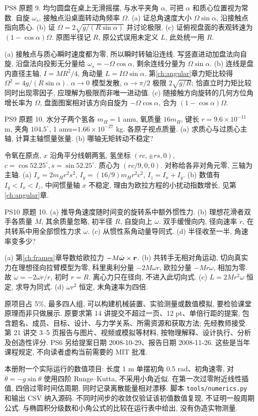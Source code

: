 \begin{exercise}
PS8 原题 9. 均匀圆盘在桌上无滑摇摆, 与水平夹角 $\alpha$, 可把 $\alpha$ 和质心位置视为常数. 自旋 $\omega_s$, 接触点沿桌面转动角频率 $\Omega$. (a) 证总角速度大小 $\Omega\sin\alpha$, 沿接触点指向质心. (b) 证 $\Omega=2\sqrt{g/(R\sin\alpha)}$ 并讨论极限. (c) 证俯视盘面的表观转速为 $(1-\cos\alpha)\Omega$. 原图半径记 $R$, 原公式误用未定义 $L$, 此处统一用 $R$.
\end{exercise}
\begin{solution}
(a) 接触点与质心瞬时速度都为零, 所以瞬时转轴沿连线. 写竖直进动加盘法向自旋, 沿盘法向投影无分量给 $\omega_s=-\Omega\cos\alpha$, 剩余连线分量为 $\Omega\sin\alpha$. (b) 连线是盘内直径主轴, $I=MR^2/4$, 角动量 $L=I\Omega\sin\alpha$. 第\ref{ch:angular}章力矩比较得 $\Omega^2=4g/(R\sin\alpha)$. $\alpha\to0$ 模型发散, $\alpha\to\pi/2$ 极限 $2\sqrt{g/R}$; 恰直立时力矩比较同时出现零因子, 应理解为极限而非唯一进动值. (c) 随接触方向旋转的几何方位角增长率为 $\Omega$, 盘面图案相对该方向自旋为 $-\Omega\cos\alpha$, 合为 $(1-\cos\alpha)\Omega$.
\end{solution}
\begin{exercise}
PS9 原题 10. 水分子两个氢各 $m_H=1$ amu, 氧质量 $16m_H$, 键长 $r=9.6\times10^{-11}$ m, 夹角 $104.5^\circ$, 1 amu=$1.66\times10^{-27}$ kg. 各原子视点质量. (a) 求质心与过质心主轴, 计算主轴惯量张量. (b) 哪轴无矩转动不稳定?
\end{exercise}
\begin{solution}
令氧在原点, $x$ 沿角平分线朝两氢, 氢坐标 $(r c,\pm r s,0)$, $c=\cos52.25^\circ,s=\sin52.25^\circ$. 质心为 $(rc/9,0,0)$. 对称给各非对角元零, 三轴为主轴. (a) $I_x=2m_Hr^2s^2$, $I_y=(16/9)m_Hr^2c^2$, $I_z=I_x+I_y$. (b) 数值有 $I_y<I_x<I_z$, 中间惯量轴 $x$ 不稳定, 理由为欧拉方程的小扰动指数增长, 见第\ref{ch:angular}章.
\end{solution}
\begin{exercise}
PS10 原题 10. (a) 推导角速度随时间变的旋转系中额外惯性力. (b) 理想花滑者双手各质量 $M$, 其余质量忽略, 初半径 $R$, 自旋向上 $\omega$. 双手缓慢向内, 径向速率 $\dot r$, 在共转系中用全部惯性力求 $\dot\omega$. (c) 从惯性系角动量导同式. (d) 半径收至一半, 角速率变多少?
\end{exercise}
\begin{solution}
(a) 第\ref{ch:frames}章导数给欧拉力 $-M\dot{\boldsymbol{\omega}}\times\boldsymbol{r}$. (b) 共转手无相对角运动, 切向真实力在理想径向拉臂模型为零, 科里奥利分量 $-2M\omega\dot r$, 欧拉分量 $-Mr\dot\omega$, 相加为零. 故 $\dot\omega=-2\omega\dot r/r$, 初时 $r=R$. 离心力只在径向, 不进入此切向式. (c) $L=2Mr^2\omega$ 恒定, 求导为同式. (d) $\omega r^2$ 恒定, 末角速率为四倍.
\end{solution}
原项目占 5\%, 最多四人组, 可以构建机械装置、实验测量或数值模拟, 要检验课堂原理而非只做展示. 原要求第 14 讲提交不超过一页、12 pt、单倍行距的提案, 包含题名、成员、目标、设计、与力学关系、所需资源和获取方法; 先经教师接受. 第 21 讲交 3--5 页报告与图片、视频或模拟等材料, 按物理解释、设计执行、分析及创造性评分. PS6 另给提案日期 2008-10-29、报告日期 2008-11-26. 这些是当年课程规定, 不向读者虚构当前需要的 MIT 批准.

本册附一个实际运行的数值项目: 长度 1 m 单摆初角 0.5 rad、初角速零, 对 $\ddot\theta=-g\sin\theta$ 使用四阶 Runge--Kutta, 不采用小角近似. 在第一次过零附近线性插值, 四倍过零时间估周期, 同时记录离散能量相对漂移. 脚本 \texttt{tools/numerics.py} 和输出 CSV 纳入源码. 不同时间步的收敛仅验证该初值数值复现, 不证明一般周期公式. 与椭圆积分级数和小角公式的比较在运行表中给出, 没有伪造实物测量.

